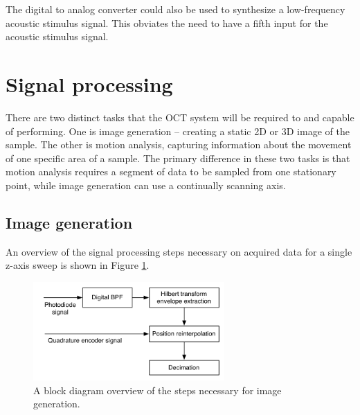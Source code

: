 The digital to analog converter could also be used to synthesize a low-frequency acoustic stimulus signal. This obviates the need to have a fifth input for the acoustic stimulus signal.


\section{Signal processing}
\label{sec:sig_proc}

There are two distinct tasks that the OCT system will be required to and capable of performing. One is image generation -- creating a static 2D or 3D image of the sample. The other is motion analysis, capturing information about the movement of one specific area of a sample. The primary difference in these two tasks is that motion analysis requires a segment of data to be sampled from one stationary point, while image generation can use a continually scanning axis.


\subsection{Image generation}
\label{sec:imgen}

An overview of the signal processing steps necessary on acquired data for a single z-axis sweep is shown in Figure \ref{fig:imagegen}.

\begin{figure}[h!]
\centering
\includegraphics[width=0.65\textwidth]{Images/Background/image_analysis.png}
\caption{A block diagram overview of the steps necessary for image generation. \label{fig:imagegen}}
\end{figure}

